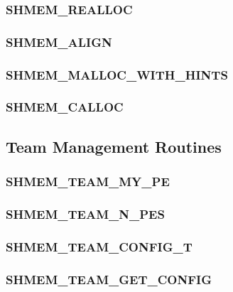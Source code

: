 \documentclass[10pt,oneside]{book}
\begin{document}
\subsubsection{\textbf{SHMEM\_REALLOC}}\label{subsec:shmem_realloc}


\subsubsection{\textbf{SHMEM\_ALIGN}}\label{subsec:shmem_align}


\subsubsection{\textbf{SHMEM\_MALLOC\_WITH\_HINTS}}\label{subsec:shmmallochint}


\subsubsection{\textbf{SHMEM\_CALLOC}}\label{subsec:shmem_calloc}




\subsection{Team Management Routines}\label{subsec:team}


\subsubsection{\textbf{SHMEM\_TEAM\_MY\_PE}}\label{subsec:shmem_team_my_pe}


\subsubsection{\textbf{SHMEM\_TEAM\_N\_PES}}\label{subsec:shmem_team_n_pes}


\subsubsection{\textbf{SHMEM\_TEAM\_CONFIG\_T}}
\label{subsec:shmem_team_config_t}


\subsubsection{\textbf{SHMEM\_TEAM\_GET\_CONFIG}}\label{subsec:shmem_team_get_config}

\end{document}
